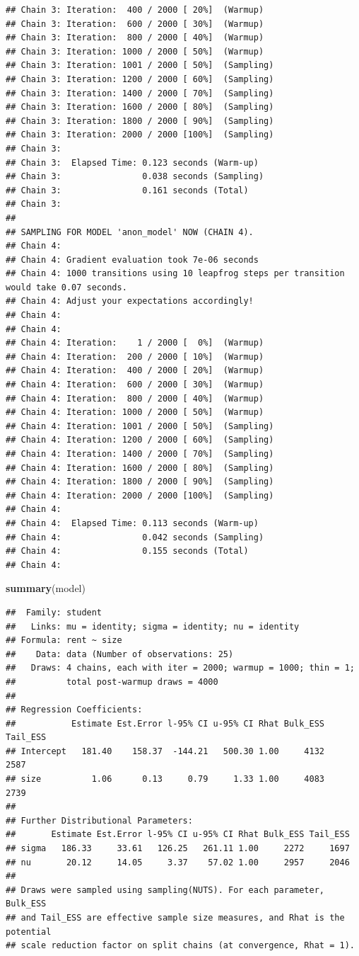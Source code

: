 \documentclass[
]{article}
\newenvironment{Shaded}{\begin{snugshade}}{\end{snugshade}}
\newcommand{\FunctionTok}[1]{\textcolor[rgb]{0.13,0.29,0.53}{\textbf{#1}}}
\newcommand{\NormalTok}[1]{#1}
\begin{document}
\begin{verbatim}
## Chain 3: Iteration:  400 / 2000 [ 20%]  (Warmup)
## Chain 3: Iteration:  600 / 2000 [ 30%]  (Warmup)
## Chain 3: Iteration:  800 / 2000 [ 40%]  (Warmup)
## Chain 3: Iteration: 1000 / 2000 [ 50%]  (Warmup)
## Chain 3: Iteration: 1001 / 2000 [ 50%]  (Sampling)
## Chain 3: Iteration: 1200 / 2000 [ 60%]  (Sampling)
## Chain 3: Iteration: 1400 / 2000 [ 70%]  (Sampling)
## Chain 3: Iteration: 1600 / 2000 [ 80%]  (Sampling)
## Chain 3: Iteration: 1800 / 2000 [ 90%]  (Sampling)
## Chain 3: Iteration: 2000 / 2000 [100%]  (Sampling)
## Chain 3: 
## Chain 3:  Elapsed Time: 0.123 seconds (Warm-up)
## Chain 3:                0.038 seconds (Sampling)
## Chain 3:                0.161 seconds (Total)
## Chain 3: 
## 
## SAMPLING FOR MODEL 'anon_model' NOW (CHAIN 4).
## Chain 4: 
## Chain 4: Gradient evaluation took 7e-06 seconds
## Chain 4: 1000 transitions using 10 leapfrog steps per transition would take 0.07 seconds.
## Chain 4: Adjust your expectations accordingly!
## Chain 4: 
## Chain 4: 
## Chain 4: Iteration:    1 / 2000 [  0%]  (Warmup)
## Chain 4: Iteration:  200 / 2000 [ 10%]  (Warmup)
## Chain 4: Iteration:  400 / 2000 [ 20%]  (Warmup)
## Chain 4: Iteration:  600 / 2000 [ 30%]  (Warmup)
## Chain 4: Iteration:  800 / 2000 [ 40%]  (Warmup)
## Chain 4: Iteration: 1000 / 2000 [ 50%]  (Warmup)
## Chain 4: Iteration: 1001 / 2000 [ 50%]  (Sampling)
## Chain 4: Iteration: 1200 / 2000 [ 60%]  (Sampling)
## Chain 4: Iteration: 1400 / 2000 [ 70%]  (Sampling)
## Chain 4: Iteration: 1600 / 2000 [ 80%]  (Sampling)
## Chain 4: Iteration: 1800 / 2000 [ 90%]  (Sampling)
## Chain 4: Iteration: 2000 / 2000 [100%]  (Sampling)
## Chain 4: 
## Chain 4:  Elapsed Time: 0.113 seconds (Warm-up)
## Chain 4:                0.042 seconds (Sampling)
## Chain 4:                0.155 seconds (Total)
## Chain 4:
\end{verbatim}

\begin{Shaded}
\begin{Highlighting}[]
\FunctionTok{summary}\NormalTok{(model)}
\end{Highlighting}
\end{Shaded}

\begin{verbatim}
##  Family: student 
##   Links: mu = identity; sigma = identity; nu = identity 
## Formula: rent ~ size 
##    Data: data (Number of observations: 25) 
##   Draws: 4 chains, each with iter = 2000; warmup = 1000; thin = 1;
##          total post-warmup draws = 4000
## 
## Regression Coefficients:
##           Estimate Est.Error l-95% CI u-95% CI Rhat Bulk_ESS Tail_ESS
## Intercept   181.40    158.37  -144.21   500.30 1.00     4132     2587
## size          1.06      0.13     0.79     1.33 1.00     4083     2739
## 
## Further Distributional Parameters:
##       Estimate Est.Error l-95% CI u-95% CI Rhat Bulk_ESS Tail_ESS
## sigma   186.33     33.61   126.25   261.11 1.00     2272     1697
## nu       20.12     14.05     3.37    57.02 1.00     2957     2046
## 
## Draws were sampled using sampling(NUTS). For each parameter, Bulk_ESS
## and Tail_ESS are effective sample size measures, and Rhat is the potential
## scale reduction factor on split chains (at convergence, Rhat = 1).
\end{verbatim}
\end{document}
